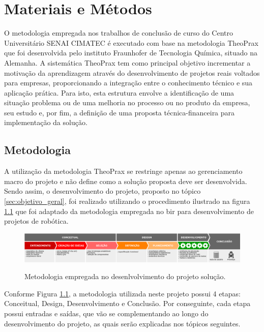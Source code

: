 \chapter{Materiais e Métodos}
\label{chap:materiais_metodos}
O metodologia empregada nos trabalhos de conclusão de curso do Centro Universitário SENAI CIMATEC é executado com base na metodologia TheoPrax que foi desenvolvida pelo instituto Fraunhofer de Tecnologia Química, situado na Alemanha. A sistemática TheoPrax tem como principal objetivo incrementar a motivação da aprendizagem através do desenvolvimento de projetos reais voltados para empresas, proporcionando a integração entre o conhecimento técnico e sua aplicação prática. Para isto, esta estrutura envolve a identificação de uma situação problema ou de uma melhoria no processo ou no produto da empresa, seu estudo e, por fim, a definição de uma proposta técnica-financeira para implementação da solução.

\section{Metodologia}
\label{sec:metodologia}
A utilização da metodologia TheoPrax se restringe apenas ao gerenciamento macro do projeto e não define como a solução proposta deve ser desenvolvida. Sendo assim, o desenvolvimento do projeto, proposto no tópico \ref{sec:objetivo_geral}, foi realizado utilizando o procedimento ilustrado na figura \ref{fig:metodologia_diagrama} que foi adaptado da metodologia empregada no \gls*{bir} para desenvolvimento de projetos de robótica.

\begin{figure}[H]
	\centering
	\caption{Metodologia empregada no desenlvolvimento do projeto solução.}
	\includegraphics[width=1\textwidth]
	{Figures/metodologia_diagrama}
	\label{fig:metodologia_diagrama}
\end{figure}	

Conforme Figura \ref{fig:metodologia_diagrama}, a metodologia utilizada neste projeto possui 4 etapas: Conceitual, Design, Desenvolvimento e Conclusão. Por conseguinte, cada etapa possui entradas e saídas, que vão se complementando ao longo do desenvolvimento do projeto, as quais serão explicadas nos tópicos seguintes.

